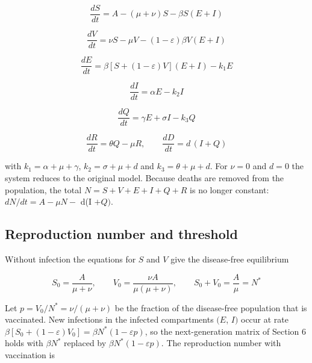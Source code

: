 \documentclass[12pt,a4paper]{article}
\theoremstyle{definition}
\begin{document}
\begin{equation}
\frac{dS}{dt} = A-(\mu+\nu)S-\beta S(E+I)
\end{equation}

\begin{equation}
\frac{dV}{dt} = \nu S-\mu V-(1-\varepsilon)\beta V(E+I)
\end{equation}

\begin{equation}
\frac{dE}{dt} = \beta\left[S+(1-\varepsilon)V\right](E+I)-k_1E
\end{equation}

\begin{equation}
\frac{dI}{dt} = \alpha E-k_2I
\end{equation}

\begin{equation}
\frac{dQ}{dt} = \gamma E+\sigma I-k_3Q
\end{equation}

\begin{equation}
\frac{dR}{dt}=\theta Q-\mu R,\qquad \frac{dD}{dt}=d\,(I+Q)
\end{equation}

with $k_{1} = \alpha + \mu + \gamma$, $k_{2} = \sigma + \mu + d$ and $k_{3} = \theta + \mu + d$. For $\nu = 0$ and $d = 0$ the system reduces to the original model. Because deaths are removed from the population, the total $N = S + V + E + I + Q + R$ is no longer constant: $dN/dt = A - \mu N -$ d(I $+ Q)$.


\subsection{Reproduction number and threshold}

Without infection the equations for $S$ and $V$ give the disease-free equilibrium


\begin{equation}
S_0 = \frac{A}{\mu+\nu},\qquad V_0 = \frac{\nu A}{\mu(\mu+\nu)},\qquad S_0+V_0 = \frac{A}{\mu} = N^*
\end{equation}

Let $p = V_{0}/N^* = \nu /(\mu + \nu )$ be the fraction of the disease-free population that is vaccinated. New infections in the infected compartments $(E$, $I)$ occur at rate $\beta [S_{0} + (1 - \varepsilon )V_{0}] = \beta N^*(1 - \varepsilon p)$, so the next-generation matrix of Section 6 holds with $\beta N^*$ replaced by $\beta N^*(1 - \varepsilon p)$. The reproduction number with vaccination is
\end{document}
